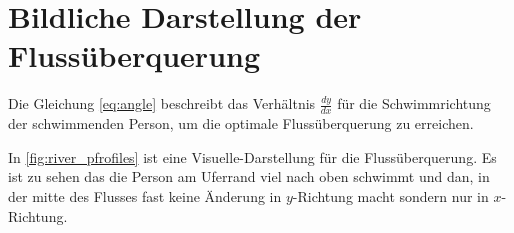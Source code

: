 %
%
%
%
\section{Bildliche Darstellung der Flussüberquerung
\label{schwimmen:section:bildliche_darstellung}}



Die Gleichung \ref{eq:angle} beschreibt das Verhältnis \(\frac{dy}{dx}\) für die Schwimmrichtung der schwimmenden Person, um die optimale Flussüberquerung zu erreichen. 

In \ref{fig:river_pfrofiles} ist eine Visuelle-Darstellung für die Flussüberquerung. Es ist zu sehen das die Person am Uferrand viel nach oben schwimmt und dan, in der mitte des Flusses fast keine Änderung in \(y\)-Richtung macht sondern nur in \(x\)-Richtung.




